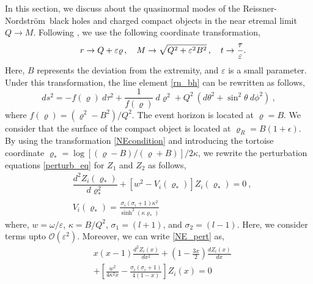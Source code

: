 \documentclass[aps,prd,twocolumn,floatfix,noshowpacs,tightenlines,noshowkeys,superscriptaddress,amsmath,amssymb,
nofootinbib]{revtex4-1}
\renewcommand\[{\begin{equation}}
\renewcommand\]{\end{equation}}
\def\RN{Reissner-Nordstr\"{o}m}
\def\ro{\varrho}
\begin{document}
In this section, we discuss about the quasinormal modes of the \RN\ black holes and charged compact objects in the near etremal limit $Q\to M$. Following \cite{Kim:2012mh,Chen:2012zn,Rahman:2018oso}, we use the following coordinate transformation,
	\begin{eqnarray}{\label{NEcondition}}
		& &{r}\to Q+\varepsilon \varrho\,,\quad 
		{M}\to \sqrt{Q^{2}+\varepsilon^{2}B^{2}}\,, \quad 
		{t}\to \frac{\tau}{\varepsilon}.
	\end{eqnarray}
	Here, $B$ represents the deviation from the extremity, and $\varepsilon$ is a small parameter. Under this transformation, the line element \autoref{rn_bh} can be rewritten as follows,
	\begin{equation}\label{RNNE}
		ds^{2}=-f(\varrho)~d\tau^{2}+\frac{1}{f(\varrho)}~d\varrho^{2}+Q^{2}~(d\theta^{2}+\sin^{2}{\theta}~d\phi^{2}) ~,
	\end{equation}
	where $f(\ro)=(\ro^{2}-B^{2})/{Q^{2}}$. The event horizon is located at $\ro=B$. We consider that the surface of the compact object is located at $\ro_R=B(1+\epsilon)$. By using the transformation \autoref{NEcondition} and introducing the tortoise coordinate $\ro_{*}=\log[(\ro-B)/(\ro+B)]/2\kappa$, we rewrite the perturbation equations \autoref{perturb_eq} for $Z_1$ and $Z_2$ as follows,
\begin{equation}\label{NE_pert}
\begin{aligned}
&\dfrac{d^2 Z_i(\ro_{*})}{d\ro_{*}^2}+\left[w^2-V_i(\ro_{*})\right]Z_i(\ro_{*})=0~,\\
&V_i(\ro_{*})=\frac{\sigma_i(\sigma_i+1)\kappa^2}{\sinh^2{(\kappa \ro_{*})}}
\end{aligned}
\end{equation}
where, $w=\omega/\varepsilon$, $\kappa=B/Q^2$, $\sigma_1=(l+1)$, and $\sigma_2=(l-1)$. Here, we consider terms upto $\mathcal{O}(\varepsilon^2)$. Moreover, we can write \autoref{NE_pert} as, 
\begin{equation}\label{NE_pert_1}
\begin{aligned}
&x(x-1)\frac{d^{2}Z_i(x)}{dx^{2}}+(1-\frac{3x}{2})\frac{dZ_i(x)}{dx}\\&+\left[\frac{w^2}{4\kappa^2 x}-\frac{\sigma_i(\sigma_i+1)}{4(1-x)}\right]Z_i(x)=0
\end{aligned}
\end{equation}
\end{document}
